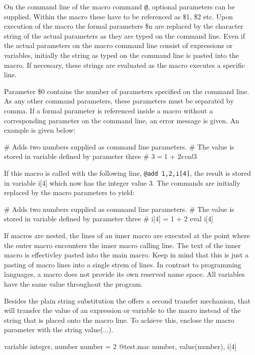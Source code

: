 On the command line of the macro command {\tt @}, optional
parameters can be supplied.  Within the macro these have to be
referenced as \$1, \$2 etc.  Upon execution of the macro the formal
parameters \$n are replaced by the character string of the actual
parameters as they are typed on the command line. Even if the actual
parameters on the macro command line consist of expressions or 
variables, initially the string as typed on the command line is
pasted into the macro. If necessary, these strings are evaluated
as the macro executes a specific line.

Parameter \$0 contains the number of
parameters specified on the command line. As any other command
parameters, these parameters must be separated by comma.  If a
formal parameter is referenced inside a macro without a
corresponding parameter on the command line, an error message is
given.  An example is given below:

\begin{MacVerbatim}
     # Adds two numbers supplied as command line parameters.
     # The value is stored in variable defined by parameter three
     #
     $3 = $1 + $2
     eval $3
\end{MacVerbatim}

If this macro is called with the following line, {\tt @add
1,2,i[4]}, the result is stored in variable i[4] which now has the
integer value 3. The commands are initially replaced by the 
macro parameters to yield:
\begin{MacVerbatim}
     # Adds two numbers supplied as command line parameters.
     # The value is stored in variable defined by parameter three
     #
     i[4] = 1 + 2
     eval i[4]
\end{MacVerbatim}

If macros are nested, the lines of an inner macro are executed
at the point where the outer macro encounters the inner macro calling 
line. The text of the inner macro is effectivley pasted into the main
macro. Keep in mind that this is just a pasting of macro lines into 
a single strem of lines. In contrast to programming languages, 
a macro does not provide its own reserved name space. All variables 
have the same value throughout the program. 
\par
Besides the plain string substitution the \Suite offers a second 
transfer mechanism, that will transfer the value of an expression or
variable to the macro instead of the string that is placed onto 
the macro line. To achieve this, enclose the macro parameter with the
string value(...).
\begin{MacVerbatim}
     variable integer, number
     number = 2
     @test.mac number, value(number), i[4]
\end{MacVerbatim}

